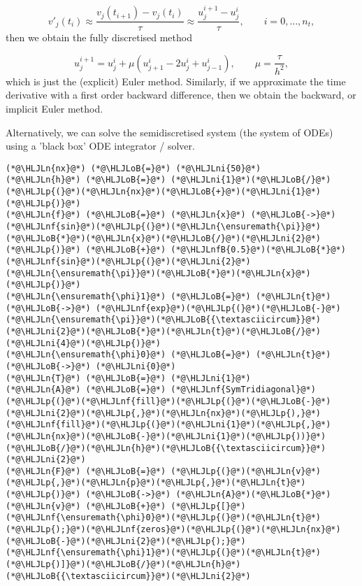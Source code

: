 \documentclass[12pt,a4paper]{article}
\newcommand{\HLJLn}[1]{#1}
\newcommand{\HLJLnf}[1]{\textcolor[RGB]{66,102,213}{#1}}
\newcommand{\HLJLnfB}[1]{\textcolor[RGB]{59,151,46}{#1}}
\newcommand{\HLJLni}[1]{\textcolor[RGB]{59,151,46}{#1}}
\newcommand{\HLJLoB}[1]{\textcolor[RGB]{102,102,102}{\textbf{#1}}}
\newcommand{\HLJLp}[1]{#1}
\begin{document}
\[
v'_j(t_i) \approx \frac{v_j(t_{i+1}) - v_j(t_i)}{\tau} \approx \frac{u^{i+1}_j - u^i_j}{\tau}, \qquad i = 0, \ldots, n_t,
\]
then we obtain the fully discretised method

\[
u^{i+1}_j = u^i_j + \mu\left(u^i_{j+1} - 2u^i_j + u^i_{j-1}   \right), \qquad \mu = \frac{\tau}{h^2},
\]
which is just the (explicit) Euler method.   Similarly, if we approximate the time derivative with a first order backward difference, then we obtain the backward, or implicit Euler method. 

Alternatively, we can solve the semidiscretised system (the system of ODEs) using a 'black box' ODE integrator / solver.


\begin{lstlisting}
(*@\HLJLn{nx}@*) (*@\HLJLoB{=}@*) (*@\HLJLni{50}@*)
(*@\HLJLn{h}@*) (*@\HLJLoB{=}@*) (*@\HLJLni{1}@*)(*@\HLJLoB{/}@*)(*@\HLJLp{(}@*)(*@\HLJLn{nx}@*)(*@\HLJLoB{+}@*)(*@\HLJLni{1}@*)(*@\HLJLp{)}@*)
(*@\HLJLn{f}@*) (*@\HLJLoB{=}@*) (*@\HLJLn{x}@*) (*@\HLJLoB{->}@*) (*@\HLJLnf{sin}@*)(*@\HLJLp{(}@*)(*@\HLJLn{\ensuremath{\pi}}@*)(*@\HLJLoB{*}@*)(*@\HLJLn{x}@*)(*@\HLJLoB{/}@*)(*@\HLJLni{2}@*)(*@\HLJLp{)}@*) (*@\HLJLoB{+}@*) (*@\HLJLnfB{0.5}@*)(*@\HLJLoB{*}@*)(*@\HLJLnf{sin}@*)(*@\HLJLp{(}@*)(*@\HLJLni{2}@*)(*@\HLJLn{\ensuremath{\pi}}@*)(*@\HLJLoB{*}@*)(*@\HLJLn{x}@*)(*@\HLJLp{)}@*)
(*@\HLJLn{\ensuremath{\phi}1}@*) (*@\HLJLoB{=}@*) (*@\HLJLn{t}@*) (*@\HLJLoB{->}@*) (*@\HLJLnf{exp}@*)(*@\HLJLp{(}@*)(*@\HLJLoB{-}@*)(*@\HLJLn{\ensuremath{\pi}}@*)(*@\HLJLoB{{\textasciicircum}}@*)(*@\HLJLni{2}@*)(*@\HLJLoB{*}@*)(*@\HLJLn{t}@*)(*@\HLJLoB{/}@*)(*@\HLJLni{4}@*)(*@\HLJLp{)}@*)
(*@\HLJLn{\ensuremath{\phi}0}@*) (*@\HLJLoB{=}@*) (*@\HLJLn{t}@*) (*@\HLJLoB{->}@*) (*@\HLJLni{0}@*)
(*@\HLJLn{T}@*) (*@\HLJLoB{=}@*) (*@\HLJLni{1}@*)
(*@\HLJLn{A}@*) (*@\HLJLoB{=}@*) (*@\HLJLnf{SymTridiagonal}@*)(*@\HLJLp{(}@*)(*@\HLJLnf{fill}@*)(*@\HLJLp{(}@*)(*@\HLJLoB{-}@*)(*@\HLJLni{2}@*)(*@\HLJLp{,}@*)(*@\HLJLn{nx}@*)(*@\HLJLp{),}@*)(*@\HLJLnf{fill}@*)(*@\HLJLp{(}@*)(*@\HLJLni{1}@*)(*@\HLJLp{,}@*)(*@\HLJLn{nx}@*)(*@\HLJLoB{-}@*)(*@\HLJLni{1}@*)(*@\HLJLp{))}@*)(*@\HLJLoB{/}@*)(*@\HLJLn{h}@*)(*@\HLJLoB{{\textasciicircum}}@*)(*@\HLJLni{2}@*)
(*@\HLJLn{F}@*) (*@\HLJLoB{=}@*) (*@\HLJLp{(}@*)(*@\HLJLn{v}@*)(*@\HLJLp{,}@*)(*@\HLJLn{p}@*)(*@\HLJLp{,}@*)(*@\HLJLn{t}@*)(*@\HLJLp{)}@*) (*@\HLJLoB{->}@*) (*@\HLJLn{A}@*)(*@\HLJLoB{*}@*)(*@\HLJLn{v}@*) (*@\HLJLoB{+}@*) (*@\HLJLp{[}@*)(*@\HLJLnf{\ensuremath{\phi}0}@*)(*@\HLJLp{(}@*)(*@\HLJLn{t}@*)(*@\HLJLp{);}@*)(*@\HLJLnf{zeros}@*)(*@\HLJLp{(}@*)(*@\HLJLn{nx}@*)(*@\HLJLoB{-}@*)(*@\HLJLni{2}@*)(*@\HLJLp{);}@*)(*@\HLJLnf{\ensuremath{\phi}1}@*)(*@\HLJLp{(}@*)(*@\HLJLn{t}@*)(*@\HLJLp{)]}@*)(*@\HLJLoB{/}@*)(*@\HLJLn{h}@*)(*@\HLJLoB{{\textasciicircum}}@*)(*@\HLJLni{2}@*)

\end{lstlisting}
\end{document}
